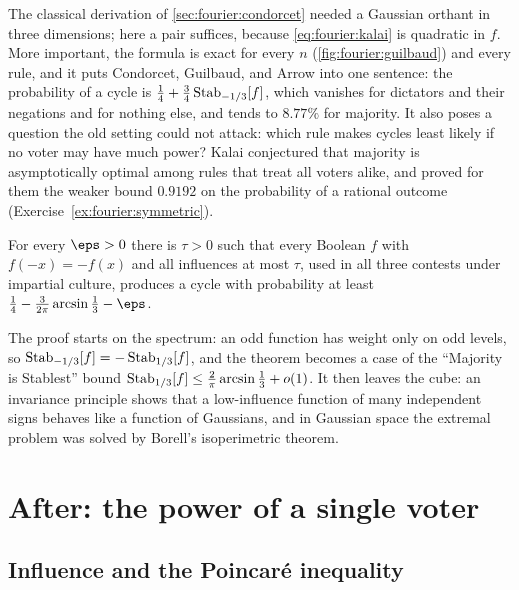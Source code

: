 \begin{refsection}
The classical derivation of \cref{sec:fourier:condorcet} needed a Gaussian orthant in three dimensions; here a pair suffices, because \eqref{eq:fourier:kalai} is quadratic in $f$. More important, the formula is exact for every $n$ (\cref{fig:fourier:guilbaud}) and every rule, and it puts Condorcet, Guilbaud, and Arrow into one sentence: the probability of a cycle is $\frac14+\frac34\operatorname{Stab}_{-1/3}[f]$, which vanishes for dictators and their negations and for nothing else, and tends to $8.77\%$ for majority. It also poses a question the old setting could not attack: which rule makes cycles least likely if no voter may have much power? Kalai conjectured that majority is asymptotically optimal among rules that treat all voters alike, and proved for them the weaker bound $0.9192$ on the probability of a rational outcome (Exercise~\ref{ex:fourier:symmetric}).

\begin{theorem}\label{thm:fourier:moo}
For every $\eps>0$ there is $\tau>0$ such that every Boolean $f$ with $f(-x)=-f(x)$ and all influences at most $\tau$, used in all three contests under impartial culture, produces a cycle with probability at least $\frac14-\frac3{2\pi}\arcsin\frac13-\eps$.
\end{theorem}

The proof starts on the spectrum: an odd function has weight only on odd levels, so $\operatorname{Stab}_{-1/3}[f]=-\operatorname{Stab}_{1/3}[f]$, and the theorem becomes a case of the ``Majority is Stablest'' bound $\operatorname{Stab}_{1/3}[f]\le\frac2\pi\arcsin\frac13+o(1)$. It then leaves the cube: an invariance principle shows that a low-influence function of many independent signs behaves like a function of Gaussians, and in Gaussian space the extremal problem was solved by Borell's isoperimetric theorem.

\section{After: the power of a single voter}\label{sec:fourier:influence}

\subsection{Influence and the Poincaré inequality}\label{sec:fourier:poincare}


\end{refsection}

